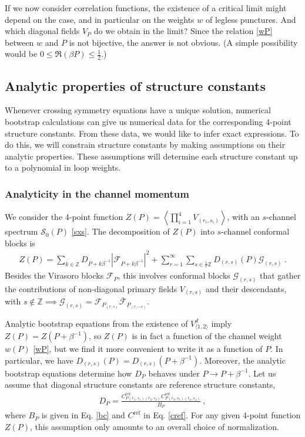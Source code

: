 \documentclass[12pt, a4paper]{article}
\begin{document}
If we now consider correlation functions, the existence of a critical limit might depend on the case, and in particular on the weights $w$ of legless punctures. And which diagonal fields $V_P$ do we obtain in the limit? Since the relation \eqref{wP} between $w$ and $P$ is not bijective, the answer is not obvious. (A simple possibility would be $0\leq \Re(\beta P)\leq \frac12$.) 


\subsection{Analytic properties of structure constants}

Whenever crossing symmetry equations have a unique solution, numerical bootstrap calculations can give us numerical data for the corresponding 4-point structure constants. From these data, we would like to infer exact expressions. To do this, we will constrain structure constants by making assumptions on their analytic properties. These assumptions will determine each structure constant up to a polynomial in loop weights.

\subsubsection{Analyticity in the channel momentum}

We consider the 4-point function $Z(P)=\left<\prod_{i=1}^4 V_{(r_i,s_i)}\right>$, with an $s$-channel spectrum $\mathcal{S}_0(P)$ \eqref{sxs}. The decomposition of $Z(P)$ into $s$-channel conformal blocks is
\begin{align}
 Z(P) = \sum_{k\in\mathbb{Z}} D_{P+k\beta^{-1}} \left|\mathcal{F}_{P+k\beta^{-1}}\right|^2 +\sum_{r=1}^\infty \sum_{s\in\frac{1}{r}\mathbb{Z}} D_{(r,s)}(P) \mathcal{G}_{(r,s)}\ .
 \label{zop}
\end{align}
Besides the Virasoro blocks $\mathcal{F}_P$, this involves conformal blocks $\mathcal{G}_{(r,s)}$ that gather the contributions of non-diagonal primary fields $V_{(r,s)}$ and their descendants, with $s\notin\mathbb{Z}\implies \mathcal{G}_{(r,s)} = \mathcal{F}_{P_{(r,s)}}\bar{\mathcal{F}}_{P_{(r,-s)}}$. 

Analytic bootstrap equations from the existence of $V^d_{\langle 1,2\rangle}$ imply $Z(P)=Z(P+\beta^{-1})$, so $Z(P)$ is in fact a function of the channel weight $w(P)$ \eqref{wP}, but we find it more convenient to write it as a function of $P$. In particular, we have $D_{(r,s)}(P)=D_{(r,s)}(P+\beta^{-1})$. Moreover, the analytic bootstrap equations 
determine how $D_P$ behaves under $P\to P+\beta^{-1}$. Let us assume that diagonal structure constants are reference structure constants,
\begin{align}
 D_P = \frac{C^\text{ref}_{P(r_1,s_1)(r_2,s_2)}C^\text{ref}_{P(r_3,s_3)(r_4,s_4)}}{B_P}\ ,
 \label{dccb}
\end{align}
where $B_P$ is given in Eq. \eqref{bc} and $C^\text{ref}$ in Eq. \eqref{cref}. For any given 4-point function $Z(P)$, this assumption only amounts to an overall choice of normalization. 
\end{document}
